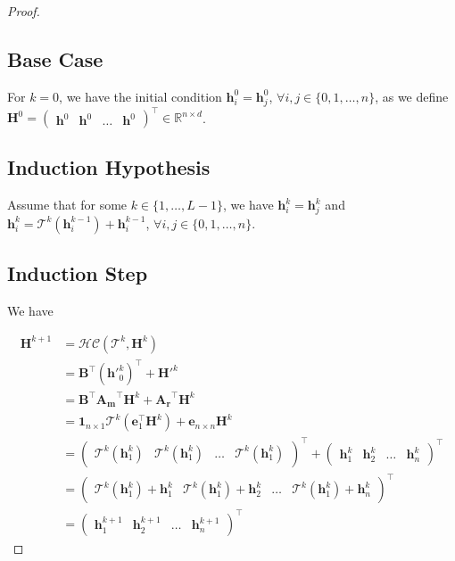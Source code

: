 \begin{proof}
\subsection*{Base Case}
For $k = 0$, we have the initial condition $\mathbf{h}_i^0 = \mathbf{h}_j^0$, $\forall i, j \in \{0, 1, \ldots, n\}$, as we define $\mathbf{H}^0 = \begin{pmatrix} \mathbf{h}^0 & \mathbf{h}^0 & \dots & \mathbf{h}^0 \end{pmatrix}^\intercal \in \mathbb{R}^{n \times d}$.

\subsection*{Induction Hypothesis}
Assume that for some $k \in \{1, \ldots, L-1\}$, we have $\mathbf{h}_i^k = \mathbf{h}_j^k$ and $\mathbf{h}_i^k = \mathcal{T}^k(\mathbf{h}_i^{k-1}) + \mathbf{h}_i^{k-1}$, $\forall i, j \in \{0, 1, \ldots, n\}$.

\subsection*{Induction Step}
We have

\begin{align}
\mathbf{H}^{k+1} &= \mathcal{HC}(\mathcal{T}^k, \mathbf{H}^k) \\
&= \mathbf{B}^\intercal (\mathbf{h}'^{k}_0)^\intercal + \mathbf{H'}^k \\
&= \mathbf{B}^\intercal \mathbf{A_m}^\intercal \mathbf{H}^k + \mathbf{A_r}^\intercal \mathbf{H}^k \\
&= \mathbf{1}_{n \times 1} \mathcal{T}^k (\mathbf{e}_1^\intercal \mathbf{H}^k) + \mathbf{e}_{n \times n} \mathbf{H}^k \\
&= \begin{pmatrix}
\mathcal{T}^k(\mathbf{h}_1^k) & \mathcal{T}^k(\mathbf{h}_1^k) & \ldots & \mathcal{T}^k(\mathbf{h}_1^k)
\end{pmatrix}^\intercal + \begin{pmatrix} 
\mathbf{h}_1^k & \mathbf{h}_2^k & \dots & \mathbf{h}_n^k 
\end{pmatrix}^\intercal \\
&= \begin{pmatrix}
\mathcal{T}^k(\mathbf{h}_1^k) + \mathbf{h}_1^k & 
\mathcal{T}^k(\mathbf{h}_1^k) + \mathbf{h}_2^k &
\ldots &
\mathcal{T}^k(\mathbf{h}_1^k) + \mathbf{h}_n^k
\end{pmatrix}^\intercal \\
&= \begin{pmatrix} 
\mathbf{h}_1^{k+1} & \mathbf{h}_2^{k+1} & \dots & \mathbf{h}_n^{k+1} 
\end{pmatrix}^\intercal
\end{align}


\end{proof}
